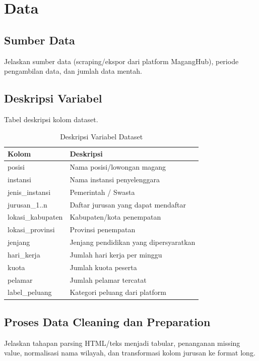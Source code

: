 \documentclass[11pt,a4paper]{report}
\begin{document}
\chapter{Data}

\section{Sumber Data}
Jelaskan sumber data (scraping/ekspor dari platform MagangHub), periode pengambilan data, dan jumlah data mentah.

\section{Deskripsi Variabel}
Tabel deskripsi kolom dataset.

\begin{table}[H]
\centering
\caption{Deskripsi Variabel Dataset}
\begin{tabular}{ll}
\toprule
\textbf{Kolom} & \textbf{Deskripsi} \\
\midrule
posisi & Nama posisi/lowongan magang \\
instansi & Nama instansi penyelenggara \\
jenis\_instansi & Pemerintah / Swasta \\
jurusan\_1..n & Daftar jurusan yang dapat mendaftar \\
lokasi\_kabupaten & Kabupaten/kota penempatan \\
lokasi\_provinsi & Provinsi penempatan \\
jenjang & Jenjang pendidikan yang dipersyaratkan \\
hari\_kerja & Jumlah hari kerja per minggu \\
kuota & Jumlah kuota peserta \\
pelamar & Jumlah pelamar tercatat \\
label\_peluang & Kategori peluang dari platform \\
\bottomrule
\end{tabular}
\end{table}

\section{Proses Data Cleaning dan Preparation}
Jelaskan tahapan parsing HTML/teks menjadi tabular, penanganan missing value, normalisasi nama wilayah, dan transformasi kolom jurusan ke format long.

\end{document}
